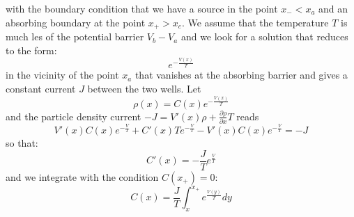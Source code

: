 with the boundary condition that we have a source in the point $x_{-} < x_a$ and an absorbing boundary at the point $x_{+} > x_c$. We assume that the temperature $T$ is much les of the potential barrier $V_b - V_a$ and we look for a solution that reduces to the form:
$$
e^{-\frac{V(x)}{T}}
$$
in the vicinity of the point $x_a$ that vanishes at the absorbing barrier and gives a constant current $J$ between the two wells. Let
\begin{equation}
\rho(x)=C(x)e^{-\frac{V(x)}{T}}
\end{equation}
and the particle density current $-J=V'(x)\rho + \frac{\partial \rho}{\partial x}T$ reads
$$
V'(x)C(x)e^{-\frac{V}{T}} + C'(x)Te^{-\frac{V}{T}} - V'(x)C(x)e^{-\frac{V}{T}} = -J
$$
so that: 
$$
C'(x) = -\frac{J}{T}e^{\frac{V}{T}}
$$
and we integrate with the condition $C(x_{+}) = 0$:
$$
C(x) = \frac{J}{T}\int_{x}^{x_{+}} e^{\frac{V(y)}{T}}dy
$$


